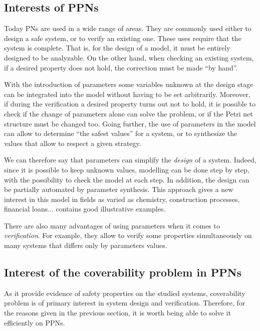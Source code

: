 \subsection{Interests of \acp{PPN}}


Today \acp{PN} are used in a wide range of areas.
They are commonly used either to design a safe system, or to verify an existing one.
These uses require that the system is complete.
That is, for the design of a model, it must be entirely designed to be analyzable.
On the other hand, when checking an existing system, if a desired property does not hold, the correction must be made ``by hand''.

With the introduction of parameters some variables unknown at the design stage can be integrated into the model without having to be set arbitrarily. Moreover, if during the verification a desired property turns out not to hold, it is possible to check if the change of parameters alone can solve the problem, or if the Petri net structure must be changed too. Going further, the use of parameters in the model can allow to determine ``the safest values'' for a system, or to synthesize the values that allow to respect a given strategy.

We can therefore say that parameters can simplify the \emph{design} of a system. Indeed, since it is possible to keep unknown values, modelling can be done step by step, with the possibility to check the model at each step.
In addition, the design can be partially automated by parameter synthesis.
This approach gives a new interest in this model in fields as varied as chemistry, construction processes, financial loans...
\cite{David17} contains good illustrative examples.

There are also many advantages of using parameters when it comes to \emph{verification}.
For example, they allow to verify some properties simultaneously on many systems that differs only by parameters values.

\subsection{Interest of the coverability problem in \acp{PPN}}


As it provide evidence of safety properties on the studied systems, coverability problem is of primary interest in system design and verification. Therefore, for the reasons given in the previous section, it is worth being able to solve it efficiently on \acp{PPN}.

